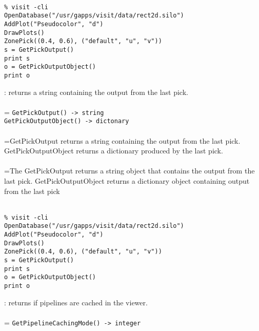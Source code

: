 \documentclass[10pt,a4paper]{report}
\begin{document}
\\[-6mm]
\begin{verbatim}% visit -cli
OpenDatabase("/usr/gapps/visit/data/rect2d.silo")
AddPlot("Pseudocolor", "d")
DrawPlots()
ZonePick((0.4, 0.6), ("default", "u", "v"))
s = GetPickOutput()
print s
o = GetPickOutputObject()
print o
\end{verbatim}
\newpage


{}
: returns a string containing the output from the last pick.\\[-3mm]

 \\ 
\hangindent=\parindent 
\verb!GetPickOutput() -> string!\\ 
\verb!GetPickOutputObject() -> dictonary!\\ [-3mm]

 \\ 
\hangindent=\parindent GetPickOutput returns a string containing the output from the last pick. GetPickOutputObject returns a dictionary produced by the last pick. \\[-3mm] 

 \\ 
\hangindent=\parindent The GetPickOutput returns a string object that contains the output from the last pick. GetPickOutputObject returns a dictionary object containing output from the  last pick \\[-3mm] 

\\[-6mm]
\begin{verbatim}% visit -cli
OpenDatabase("/usr/gapps/visit/data/rect2d.silo")
AddPlot("Pseudocolor", "d")
DrawPlots()
ZonePick((0.4, 0.6), ("default", "u", "v"))
s = GetPickOutput()
print s
o = GetPickOutputObject()
print o
\end{verbatim}
\newpage


{}
: returns if pipelines are cached in the viewer.\\[-3mm]

 \\ 
\hangindent=\parindent 
\verb!GetPipelineCachingMode() -> integer!\\ [-3mm]
\end{document}
